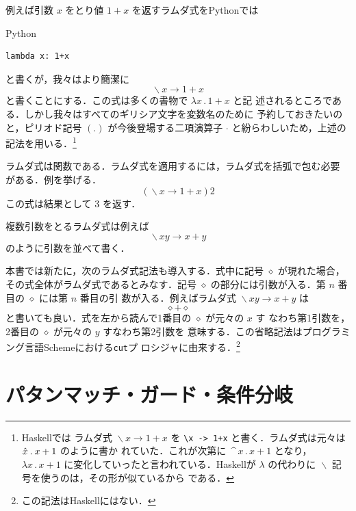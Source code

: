 \documentclass[a5paper,twoside,fleqn,draft]{jsbook}
\newcommand{\programminglanguage}[1]{\textsf{#1}}
\newcommand{\haskell}{\programminglanguage{Haskell}}
\newcommand{\python}{\programminglanguage{Python}}
\newcommand{\scheme}{\programminglanguage{Scheme}}
\newcommand{\code}[1]{\texttt{#1}}
\newenvironment{pythoncode}{\begin{itembox}[r]{\python}}{\end{itembox}}
\newcommand{\mAnonParam}{\diamond}
\DeclareMathOperator{\mLambda}{\backslash}
\DeclareMathOperator{\mLambdaArrow}{\rightarrow}
\newcommand{\mLambdaEXP}[2]{\mLambda{#1}\mLambdaArrow{#2}} %
\begin{document}
例えば引数 $x$ をとり値 $1+x$ を返すラムダ式を\python では
\begin{pythoncode}
\begin{verbatim}
lambda x: 1+x
\end{verbatim}
\end{pythoncode}
と書くが，我々はより簡潔に
\begin{equation}
  \mLambda x\mLambdaArrow1+x
\end{equation}
と書くことにする．この式は多くの書物で $\lambda x\mathbin{.}1+x$ と記
述されるところである．しかし我々はすべてのギリシア文字を変数名のために
予約しておきたいのと，ピリオド記号 $(.)$ が今後登場する二項演算子
$\cdot$ と紛らわしいため，上述の記法を用いる．\footnote{\haskell では
  ラムダ式 $\mLambda x\mLambdaArrow1+x$ を \code{\textbackslash x ->
    1+x} と書く．ラムダ式は元々は $\Hat x\mathbin{.}x+1$ のように書か
  れていた．これが次第に
  $\mathop{\texttt{\textasciicircum}}x\mathbin{.}x+1$ となり，$\lambda
  x\mathbin{.}x+1$ に変化していったと言われている．\haskell が
  $\lambda$ の代わりに $\mLambda$ 記号を使うのは，その形が似ているから
  である．}

ラムダ式は関数である．ラムダ式を適用するには，ラムダ式を括弧で包む必要
がある．例を挙げる．
\begin{equation}
  (\mLambda x\mLambdaArrow1+x)2
\end{equation}
この式は結果として $3$ を返す．

複数引数をとるラムダ式は例えば
\begin{equation}
  \mLambda xy\mLambdaArrow x+y
\end{equation}
のように引数を並べて書く．

本書では新たに，次のラムダ式記法も導入する．式中に記号 $\mAnonParam$
が現れた場合，その式全体がラムダ式であるとみなす．記号 $\mAnonParam$
の部分には引数が入る．第 $n$ 番目の $\mAnonParam$ には第 $n$ 番目の引
数が入る．例えばラムダ式 $\mLambdaEXP{xy}{x+y}$ は
\begin{equation}
  \mAnonParam+\mAnonParam
\end{equation}
と書いても良い．式を左から読んで1番目の $\mAnonParam$ が元々の $x$ す
なわち第1引数を，2番目の $\mAnonParam$ が元々の $y$ すなわち第2引数を
意味する．この省略記法はプログラミング言語\scheme における\code{cut}プ
ロシジャに由来する．\footnote{この記法は\haskell にはない．}

\section{パタンマッチ・ガード・条件分岐}
\end{document}
